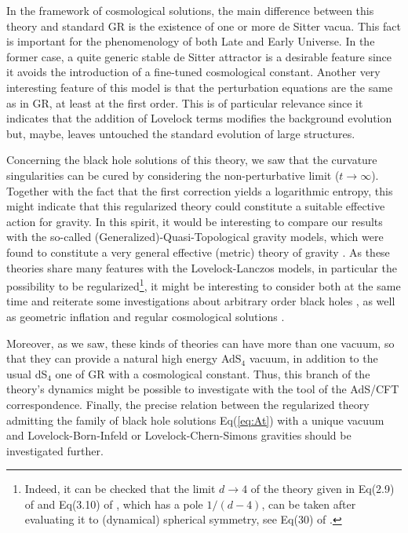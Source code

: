 \documentclass[aps,prd,preprint,nofootinbib]{revtex4-1}
\begin{document}
In the framework of cosmological solutions, the main difference between this theory and standard GR is the existence of one or more de Sitter vacua. This fact is important for the phenomenology of both Late and Early Universe. In the former case, a quite generic stable de Sitter attractor is a desirable feature since it avoids the introduction of a fine-tuned cosmological constant. Another very interesting feature of this model is that the perturbation equations are the same as in GR, at least at the first order. This is of particular relevance since it indicates that the addition of Lovelock terms modifies the background evolution but, maybe, leaves untouched the standard evolution of large structures. 

Concerning the black hole solutions of this theory, we saw that the curvature singularities can be cured by considering the non-perturbative limit ($t\to\infty$). 
Together with the fact that the first correction yields a logarithmic entropy, this might indicate that this regularized theory could constitute a suitable effective action for gravity. In this spirit, it would be interesting to compare our results with the so-called (Generalized)-Quasi-Topological gravity models, which were found to constitute a very general effective (metric) theory of gravity \cite{GQTEffAct1,GQTEffAct2}. As these theories share many features with the Lovelock-Lanczos models, in particular the possibility to be regularized\footnote{Indeed, it can be checked that the limit $d\to4$ of the theory given in Eq(2.9) of \cite{1703.01631} and Eq(3.10) of \cite{Quasi-Top1}, which has a pole $1/(d-4)$, can be taken after evaluating it to (dynamical) spherical symmetry, see Eq(30) of \cite{aim}.}, it might be interesting to consider both at the same time and reiterate some investigations about arbitrary order black holes \cite{arborderBH}, as well as geometric inflation and regular cosmological solutions \cite{geomInfl}. 


Moreover, as we saw, these kinds of theories can have more than one vacuum, so that they can provide a natural high energy AdS$_4$ vacuum, in addition to the usual dS$_4$ one of GR with a cosmological constant. Thus, this branch of the theory's dynamics might be possible to investigate with the tool of the AdS/CFT correspondence. Finally, the precise relation between the regularized theory admitting the family of black hole solutions Eq(\ref{eq:At}) with a unique vacuum and Lovelock-Born-Infeld or Lovelock-Chern-Simons gravities  \cite{Lovelock-Born-Infeld1, Lovelock-Born-Infeld2, Lovelock-Chern-Simons}  should be investigated further.
\end{document}

